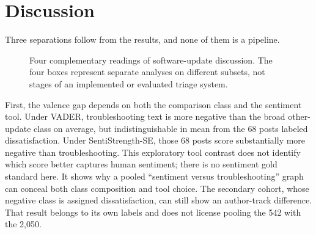 \documentclass[conference,letterpaper]{IEEEtran}
\begin{document}
\section{Discussion}
Three separations follow from the results, and none of them is a pipeline.

\begin{figure}[t]
\centering
{}
\caption{Four complementary readings of software-update discussion. The four boxes represent separate analyses on different subsets, not stages of an implemented or evaluated triage system.}
\label{fig:framework}
\end{figure}

First, the valence gap depends on both the comparison class and the sentiment tool. Under VADER, troubleshooting text is more negative than the broad other-update class on average, but indistinguishable in mean from the 68 posts labeled dissatisfaction. Under SentiStrength-SE, those 68 posts score substantially more negative than troubleshooting. This exploratory tool contrast does not identify which score better captures human sentiment; there is no sentiment gold standard here. It shows why a pooled ``sentiment versus troubleshooting'' graph can conceal both class composition and tool choice. The secondary cohort, whose negative class is assigned dissatisfaction, can still show an author-track difference. That result belongs to its own labels and does not license pooling the 542 with the 2,050.
\end{document}
